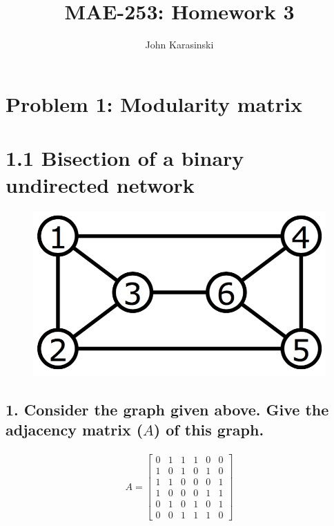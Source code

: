 \documentclass{tufte-handout}
\begin{document}
\title{MAE-253: Homework 3}
\author[John Karasinski]{John Karasinski}
\maketitle%

\section{Problem 1: Modularity matrix}

\section{1.1 Bisection of a binary undirected network}
\begin{figure}
  \includegraphics[width=0.5\linewidth]{1-1.png}
  \label{fig:textfig}
\end{figure}

\subsection{1. Consider the graph given above. Give the adjacency matrix ($A$) of this graph.}

\begin{align*}
A =
\begin{bmatrix}
  0 & 1 & 1 & 1 & 0 & 0 \\
  1 & 0 & 1 & 0 & 1 & 0 \\
  1 & 1 & 0 & 0 & 0 & 1 \\
  1 & 0 & 0 & 0 & 1 & 1 \\
  0 & 1 & 0 & 1 & 0 & 1 \\
  0 & 0 & 1 & 1 & 1 & 0
\end{bmatrix}
\end{align*}
\end{document}
